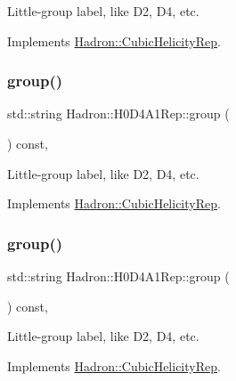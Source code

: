 Little-\/group label, like D2, D4, etc. 

Implements \mbox{\hyperlink{structHadron_1_1CubicHelicityRep_a101a7d76cd8ccdad0f272db44b766113}{Hadron\+::\+Cubic\+Helicity\+Rep}}.

\mbox{\label{structHadron_1_1H0D4A1Rep_abc2f3e6961a83aec1fdfa3909b4925dd}} 
\subsubsection{\texorpdfstring{group()}{group()}\hspace{0.1cm}{\footnotesize\ttfamily [3/5]}}
{\footnotesize\ttfamily std\+::string Hadron\+::\+H0\+D4\+A1\+Rep\+::group (\begin{DoxyParamCaption}{ }\end{DoxyParamCaption}) const\hspace{0.3cm}{\ttfamily [inline]}, {\ttfamily [virtual]}}

Little-\/group label, like D2, D4, etc. 

Implements \mbox{\hyperlink{structHadron_1_1CubicHelicityRep_a101a7d76cd8ccdad0f272db44b766113}{Hadron\+::\+Cubic\+Helicity\+Rep}}.

\mbox{\label{structHadron_1_1H0D4A1Rep_abc2f3e6961a83aec1fdfa3909b4925dd}} 
\subsubsection{\texorpdfstring{group()}{group()}\hspace{0.1cm}{\footnotesize\ttfamily [4/5]}}
{\footnotesize\ttfamily std\+::string Hadron\+::\+H0\+D4\+A1\+Rep\+::group (\begin{DoxyParamCaption}{ }\end{DoxyParamCaption}) const\hspace{0.3cm}{\ttfamily [inline]}, {\ttfamily [virtual]}}

Little-\/group label, like D2, D4, etc. 

Implements \mbox{\hyperlink{structHadron_1_1CubicHelicityRep_a101a7d76cd8ccdad0f272db44b766113}{Hadron\+::\+Cubic\+Helicity\+Rep}}.

\mbox{\label{structHadron_1_1H0D4A1Rep_abc2f3e6961a83aec1fdfa3909b4925dd}} 
